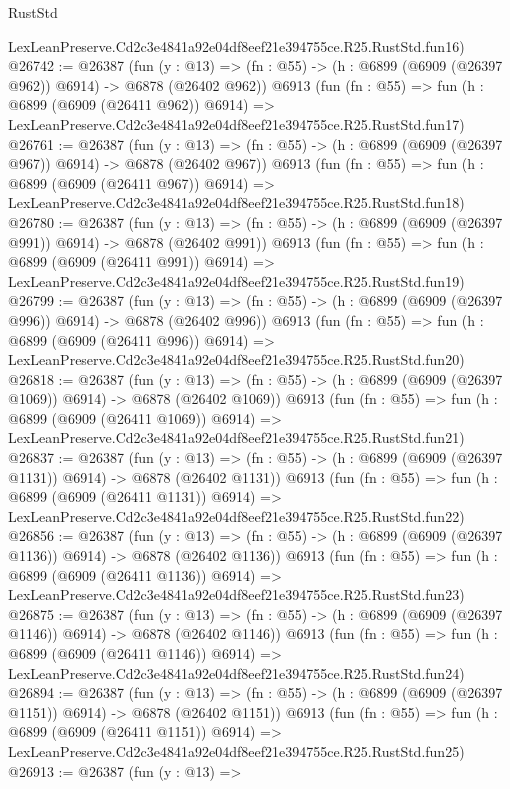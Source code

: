 \begin{lexlean}{RustStd}
\begin{coremodule}
    LexLeanPreserve.Cd2c3e4841a92e04df8eef21e394755ce.R25.RustStd.fun16)
@26742 := @26387
    (fun (y : @13) => (fn : @55) -> (h : @6899 (@6909 (@26397 @962)) @6914) -> @6878 (@26402 @962))
    @6913
    (fun (fn : @55) =>
    fun (h : @6899 (@6909 (@26411 @962)) @6914) =>
    LexLeanPreserve.Cd2c3e4841a92e04df8eef21e394755ce.R25.RustStd.fun17)
@26761 := @26387
    (fun (y : @13) => (fn : @55) -> (h : @6899 (@6909 (@26397 @967)) @6914) -> @6878 (@26402 @967))
    @6913
    (fun (fn : @55) =>
    fun (h : @6899 (@6909 (@26411 @967)) @6914) =>
    LexLeanPreserve.Cd2c3e4841a92e04df8eef21e394755ce.R25.RustStd.fun18)
@26780 := @26387
    (fun (y : @13) => (fn : @55) -> (h : @6899 (@6909 (@26397 @991)) @6914) -> @6878 (@26402 @991))
    @6913
    (fun (fn : @55) =>
    fun (h : @6899 (@6909 (@26411 @991)) @6914) =>
    LexLeanPreserve.Cd2c3e4841a92e04df8eef21e394755ce.R25.RustStd.fun19)
@26799 := @26387
    (fun (y : @13) => (fn : @55) -> (h : @6899 (@6909 (@26397 @996)) @6914) -> @6878 (@26402 @996))
    @6913
    (fun (fn : @55) =>
    fun (h : @6899 (@6909 (@26411 @996)) @6914) =>
    LexLeanPreserve.Cd2c3e4841a92e04df8eef21e394755ce.R25.RustStd.fun20)
@26818 := @26387
    (fun (y : @13) =>
    (fn : @55) -> (h : @6899 (@6909 (@26397 @1069)) @6914) -> @6878 (@26402 @1069))
    @6913
    (fun (fn : @55) =>
    fun (h : @6899 (@6909 (@26411 @1069)) @6914) =>
    LexLeanPreserve.Cd2c3e4841a92e04df8eef21e394755ce.R25.RustStd.fun21)
@26837 := @26387
    (fun (y : @13) =>
    (fn : @55) -> (h : @6899 (@6909 (@26397 @1131)) @6914) -> @6878 (@26402 @1131))
    @6913
    (fun (fn : @55) =>
    fun (h : @6899 (@6909 (@26411 @1131)) @6914) =>
    LexLeanPreserve.Cd2c3e4841a92e04df8eef21e394755ce.R25.RustStd.fun22)
@26856 := @26387
    (fun (y : @13) =>
    (fn : @55) -> (h : @6899 (@6909 (@26397 @1136)) @6914) -> @6878 (@26402 @1136))
    @6913
    (fun (fn : @55) =>
    fun (h : @6899 (@6909 (@26411 @1136)) @6914) =>
    LexLeanPreserve.Cd2c3e4841a92e04df8eef21e394755ce.R25.RustStd.fun23)
@26875 := @26387
    (fun (y : @13) =>
    (fn : @55) -> (h : @6899 (@6909 (@26397 @1146)) @6914) -> @6878 (@26402 @1146))
    @6913
    (fun (fn : @55) =>
    fun (h : @6899 (@6909 (@26411 @1146)) @6914) =>
    LexLeanPreserve.Cd2c3e4841a92e04df8eef21e394755ce.R25.RustStd.fun24)
@26894 := @26387
    (fun (y : @13) =>
    (fn : @55) -> (h : @6899 (@6909 (@26397 @1151)) @6914) -> @6878 (@26402 @1151))
    @6913
    (fun (fn : @55) =>
    fun (h : @6899 (@6909 (@26411 @1151)) @6914) =>
    LexLeanPreserve.Cd2c3e4841a92e04df8eef21e394755ce.R25.RustStd.fun25)
@26913 := @26387
    (fun (y : @13) =>

\end{coremodule}
\end{lexlean}
